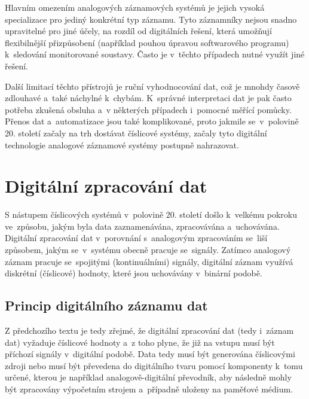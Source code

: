 Hlavním omezením analogových záznamových systémů je jejich vysoká specializace pro jediný konkrétní typ záznamu. Tyto záznamníky nejsou snadno upravitelné pro jiné účely, na rozdíl od digitálních řešení, která umožňují flexibilnější přizpůsobení (například pouhou úpravou softwarového programu) k~sledování monitorované soustavy. Často je v~těchto případech nutné využít jiné řešení.~\cite{analog_signal_and_digital_signal_processing_Tel_System}

Další limitací těchto přístrojů je ruční vyhodnocování dat, což je mnohdy časově zdlouhavé a~také náchylné k~chybám. K~správné interpretaci dat je pak často potřeba zkušená obsluha a~v některých případech i~pomocné měřící pomůcky. Přenos dat a~automatizace jsou také komplikované, proto jakmile se~v~polovině 20. století začaly na trh dostávat číslicové systémy, začaly tyto digitální technologie analogové záznamové systémy postupně nahrazovat.~\cite{rcp_analog_vs_digital, newcastle_history_of_digital_computers}


\section{Digitální zpracování dat}
\label{digitalni_zaznam_dat}
S nástupem číslicových systémů v~polovině 20. století došlo k~velkému pokroku ve~způsobu, jakým byla data zaznamenávána, zpracovávána a~uchovávána. Digitální zpracování dat v~porovnání s~analogovým zpracováním se~liší způsobem, jakým se~v~systému obecně pracuje se~signály. Zatímco analogový záznam pracuje se~spojitými (kontinuálními) signály, digitální záznam využívá diskrétní (číslicové) hodnoty, které jsou uchovávány v~binární podobě.

\subsection{Princip digitálního záznamu dat}
Z předchozího textu je tedy zřejmé, že digitální zpracování dat (tedy i~záznam dat) vyžaduje číslicové hodnoty a~z toho plyne, že již na vstupu musí být příchozí signály v~digitální podobě. Data tedy musí být generována číslicovými zdroji nebo musí být převedena do digitálního tvaru pomocí komponenty k~tomu určené, kterou je například analogově-digitální převodník, aby následně mohly být zpracovány výpočetním strojem a~případně uloženy na paměťové médium.

